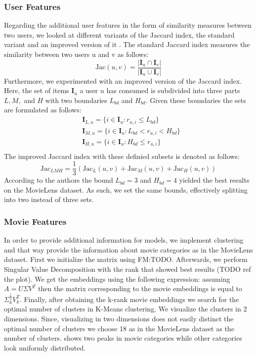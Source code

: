 \documentclass[10pt,conference,compsocconf]{IEEEtran}
\begin{document}
    \subsubsection{User Features}
    Regarding the additional user features in the form of similarity measures between two users, we looked at different variants of the Jaccard index, the standard variant and an improved version of it \cite{lee_improving_2017}.
    The standard Jaccard index measures the similarity between two users u and v as follows:
    $$\text{Jac}(u,v)=\frac{|\mathbf{I}_u \cap \mathbf{I}_v|}{|\mathbf{I}_u \cup \mathbf{I}_v|}$$
    Furthermore, we experimented with an improved version of the Jaccard index.
    Here, the set of items $\mathbf{I}_u$ a user $u$ has consumed is subdivided into three parts $L,M,$ and $H$ with two boundaries $L_{bd}$ and $H_{bd}$.
    Given these boundaries the sets are formulated as follows:
    \begin{align*}
        &\mathbf{I}_{L,u}=\{i \in \mathbf{I}_u : r_{u,i} \leq L_{bd}\}\\
        &\mathbf{I}_{M,u}=\{i \in \mathbf{I}_u : L_{bd} < r_{u,i} < H_{bd}\}\\
        &\mathbf{I}_{H,u}=\{i \in \mathbf{I}_u : H_{bd} \leq r_{u,i}\}\\
    \end{align*}
    The improved Jaccard index with these definied subsets is denoted as follows:
    $$\text{Jac}_{LMH}=\frac{1}{3}(\text{Jac}_L(u,v) + \text{Jac}_M(u,v) + \text{Jac}_H(u,v))$$
    According to the authors the bound $L_{bd} = 3$ and $H_{bd}=4$ yielded the best results on the MovieLens dataset.
    As such, we set the same bounds, effectively splitting into two instead of three sets.

    \subsubsection{Movie Features}
    In order to provide additional information for models, we implement clustering and that way provide the information
    about movie categories as in the MovieLens dataset. First we initialize the matrix using FM:TODO.
    Afterwards, we perform Singular Value Decomposition with the rank that showed best results (TODO ref the plot).
    We get the embeddings using the following expression: assuming $A=U\Sigma V^T$ then the matrix corresponding to the movie embeddings is equal to $\Sigma _k ^{\frac{1}{2}} V_k ^T$.
    Finally, after obtaining the k-rank movie embeddings we search for the optimal number of clusters in K-Means clustering.
    We visualize the clusters in 2 dimensions. Since, visualizing in two dimensions does not easily distinct the optimal
    number of clusters we choose 18 as in the MovieLens dataset as the number of clusters. 
    shows two peaks in movie categories while other categories look uniformly distributed.
\end{document}
